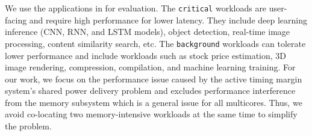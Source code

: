 \begin{table}[h!]
  \centering

  \caption{Classifying critical and background applications, based on their memory subsystem interference behavior.} 
  \vspace{-0.2cm}

  \label{tab:bench-type} 
\end{table}

We use the applications in  for evaluation. The \texttt{critical} workloads are user-facing and require high performance for lower latency. They include deep learning inference (CNN, RNN, and LSTM models), object detection, real-time image processing, content similarity search, etc. The \texttt{background} workloads can tolerate lower performance and include workloads such as stock price estimation, 3D image rendering, compression, compilation, and machine learning training. For our work, we focus on the performance issue caused by the active timing margin system's shared power delivery problem and excludes performance interference from the memory subsystem which is a general issue for all multicores. Thus, we avoid co-locating two memory-intensive workloads at the same time to simplify the problem.

